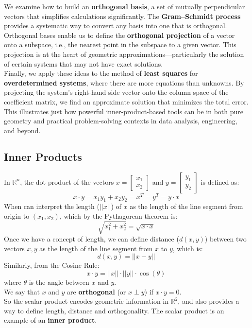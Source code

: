 \documentclass[a4paper, 9pt]{extarticle}
\begin{document}
\noindent We examine how to build an \textbf{orthogonal basis}, a set of mutually perpendicular vectors that simplifies calculations significantly. The \textbf{Gram–Schmidt process} provides a systematic way to convert any basis into one that is orthogonal. Orthogonal bases enable us to define the \textbf{orthogonal projection} of a vector onto a subspace, i.e., the nearest point in the subspace to a given vector. This projection is at the heart of geometric approximations—particularly the solution of certain systems that may not have exact solutions. \\[2ex]

\noindent Finally, we apply these ideas to the method of \textbf{least squares} for \textbf{overdetermined systems}, where there are more equations than unknowns. By projecting the system’s right-hand side vector onto the column space of the coefficient matrix, we find an approximate solution that minimizes the total error. This illustrates just how powerful inner-product-based tools can be in both pure geometry and practical problem-solving contexts in data analysis, engineering, and beyond.

\subsection{Inner Products}
In $\mathbb{R}^n$, the dot product of the vectors $x = \begin{bmatrix}x_1 \\ x_2 \end{bmatrix}$ and $y = \begin{bmatrix}y_1 \\ y_2 \end{bmatrix}$ is defined as:
$$
  x \cdot y = x_1y_1 + x_2y_2 = x^T = y^T = y\cdot x
$$
When can interpret the length ($||x||$) of $x$ as the length of the line segment from origin to $(x_1, x_2)$, which by the Pythagorean theorem is:
$$
  \sqrt{x_1^2 + x_2^2} = \sqrt{x \cdot x}
$$
Once we have a concept of length, we can define distance ($d(x,y)$) between two vectors $x,y$ as the length of the line segment from $x$ to $y$, which is:
$$
  d(x,y) = ||x - y||
$$
Similarly, from the Cosine Rule:
$$x\cdot y = ||x|| \cdot ||y|| \cdot \cos(\theta)$$
where $\theta$ is the angle between $x$ and $y$. \\
We say that $x$ and $y$ are \textbf{orthogonal} (or $x \perp y$) if $x \cdot y = 0$. \\[2ex]
So the scalar product encodes geometric information in $\mathbb{R}^2$, and also provides a way to define length, distance and orthogonality. The scalar product is an example of an \textbf{inner product}.
\end{document}
